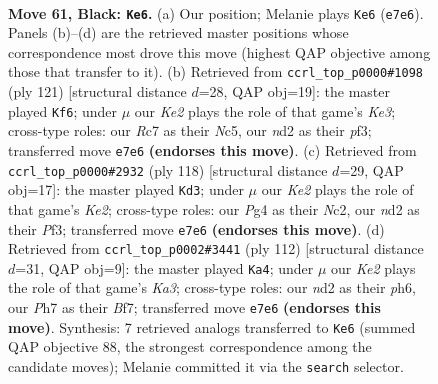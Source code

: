 \documentclass[11pt]{article}
\begin{document}
\clearpage

\begin{figure}[p]\centering
\begin{subfigure}{0.46\textwidth}\centering
\resizebox{\linewidth}{!}{%
\newchessgame
\chessboard[
  setfen={8/2r1kp1p/6p1/4P3/bn3Pp1/8/3N1K1P/1B6 b - - 13 61},
  showmover=false,
  pgfstyle=straightmove, color=movearrow, markmove={e7-e6}
]}
\caption{}
\end{subfigure}\hfill
\begin{subfigure}{0.46\textwidth}\centering
\resizebox{\linewidth}{!}{%
\newchessgame
\chessboard[
  setfen={8/5p2/4k1p1/2np3p/7P/4PPP1/2B5/5K2 b - - 4 61},
  showmover=false,
  pgfstyle=straightmove, color=movearrow, markmove={e6-f6}
]}
\caption{}
\end{subfigure}
\\[4pt]
\begin{subfigure}{0.46\textwidth}\centering
\resizebox{\linewidth}{!}{%
\newchessgame
\chessboard[
  setfen={3b4/8/8/2k1p2p/4P2P/5PP1/p1N1K3/8 w - - 0 60},
  showmover=false,
  pgfstyle=straightmove, color=movearrow, markmove={e2-d3}
]}
\caption{}
\end{subfigure}\hfill
\begin{subfigure}{0.46\textwidth}\centering
\resizebox{\linewidth}{!}{%
\newchessgame
\chessboard[
  setfen={8/5Bp1/5p1p/p7/3k1P2/KP4P1/7P/3b4 w - - 0 57},
  showmover=false,
  pgfstyle=straightmove, color=movearrow, markmove={a3-a4}
]}
\caption{}
\end{subfigure}
\caption{\textbf{Move 61, Black: \texttt{Ke6}.} (a) Our position; Melanie plays \texttt{Ke6} (\texttt{e7e6}). Panels (b)--(d) are the retrieved master positions whose correspondence most drove this move (highest QAP objective among those that transfer to it). (b) Retrieved from \texttt{ccrl\_top\_p0000\#1098} (ply 121) [structural distance $d$=28, QAP obj=19]: the master played \texttt{Kf6}; under $\mu$ our \emph{Ke2} plays the role of that game's \emph{Ke3}; cross-type roles: our \emph{R}c7 as their \emph{N}c5, our \emph{n}d2 as their \emph{p}f3; transferred move \texttt{e7e6} \textbf{(endorses this move)}. (c) Retrieved from \texttt{ccrl\_top\_p0000\#2932} (ply 118) [structural distance $d$=29, QAP obj=17]: the master played \texttt{Kd3}; under $\mu$ our \emph{Ke2} plays the role of that game's \emph{Ke2}; cross-type roles: our \emph{P}g4 as their \emph{N}c2, our \emph{n}d2 as their \emph{P}f3; transferred move \texttt{e7e6} \textbf{(endorses this move)}. (d) Retrieved from \texttt{ccrl\_top\_p0002\#3441} (ply 112) [structural distance $d$=31, QAP obj=9]: the master played \texttt{Ka4}; under $\mu$ our \emph{Ke2} plays the role of that game's \emph{Ka3}; cross-type roles: our \emph{n}d2 as their \emph{p}h6, our \emph{P}h7 as their \emph{B}f7; transferred move \texttt{e7e6} \textbf{(endorses this move)}. Synthesis: 7 retrieved analogs transferred to \texttt{Ke6} (summed QAP objective 88, the strongest correspondence among the candidate moves); Melanie committed it via the \texttt{search} selector.}
\label{fig:thought-m121}
\end{figure}
\end{document}
